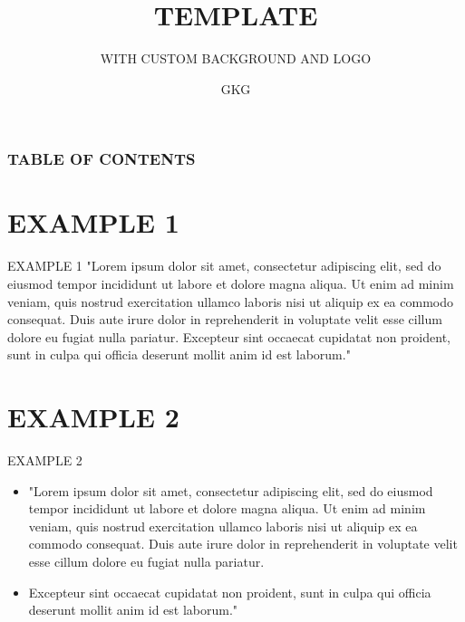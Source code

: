 \documentclass[9pt]{beamer}
\title{TEMPLATE}
\subtitle{WITH CUSTOM BACKGROUND AND LOGO}
\author{GKG }
\institute{}
\begin{document}
\titlepage

\begin{frame}

 \frametitle{TABLE OF CONTENTS}
 \tableofcontents
\end{frame}

\section{EXAMPLE 1} %
\begin{frame}{EXAMPLE 1}%
"Lorem ipsum dolor sit amet, consectetur adipiscing elit, sed do eiusmod tempor incididunt ut labore et dolore magna aliqua. Ut enim ad minim veniam, quis nostrud exercitation ullamco laboris nisi ut aliquip ex ea commodo consequat. Duis aute irure dolor in reprehenderit in voluptate velit esse cillum dolore eu fugiat nulla pariatur. Excepteur sint occaecat cupidatat non proident, sunt in culpa qui officia deserunt mollit anim id est laborum."
    
\end{frame}

\section{EXAMPLE 2}
\begin{frame}{EXAMPLE 2}
\begin{itemize}

  \setlength\itemsep{1em}  %
  
    \item "Lorem ipsum dolor sit amet, consectetur adipiscing elit, sed do eiusmod tempor incididunt ut labore et dolore magna aliqua. Ut enim ad minim veniam, quis nostrud exercitation ullamco laboris nisi ut aliquip ex ea commodo consequat. Duis aute irure dolor in reprehenderit in voluptate velit esse cillum dolore eu fugiat nulla pariatur. 
    
    \item Excepteur sint occaecat cupidatat non proident, sunt in culpa qui officia deserunt mollit anim id est laborum."
\end{itemize}
\end{frame}
\end{document}
